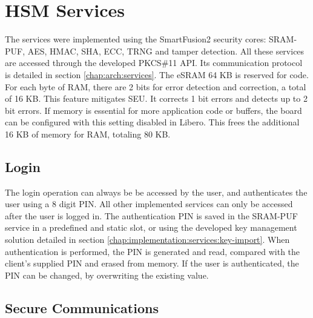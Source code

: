 \section{HSM Services}\label{chap:implementation:services}

The services were implemented using the SmartFusion2 security cores: SRAM-PUF, AES, HMAC, SHA, ECC, TRNG and tamper detection.
All these services are accessed through the developed PKCS\#11 API. Its communication protocol is detailed in section \ref{chap:arch:services}.
The eSRAM 64 KB is reserved for code. For each byte of RAM, there are 2 bits for error detection and correction, a total of 16 KB. This feature mitigates \ac{SEU}. It corrects 1 bit errors and detects up to 2 bit errors. If memory is essential for more application code or buffers, the board can be configured with this setting disabled in Libero. This frees the additional 16 KB of memory for RAM, totaling 80 KB.

\subsection{Login}\label{chap:implementation:services:authentication}

The login operation can always be be accessed by the user, and authenticates the user using a 8 digit PIN. All other implemented services can only be accessed after the user is logged in.
The authentication PIN is saved in the SRAM-PUF service in a predefined and static slot, or using the developed key management solution detailed in section \ref{chap:implementation:services:key-import}. When authentication is performed, the PIN is generated and read, compared with the client's supplied PIN and erased from memory.
If the user is authenticated, the PIN can be changed, by overwriting the existing value.

\subsection{Secure Communications}\label{chap:implementation:services:secure}

